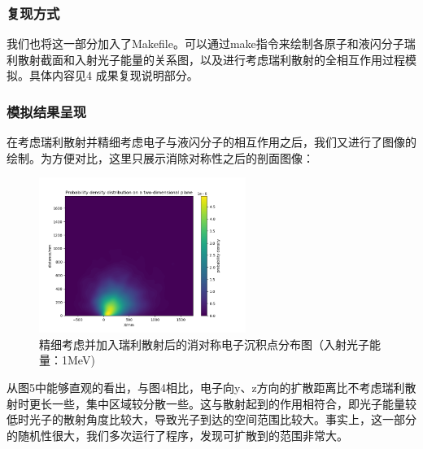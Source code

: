 \documentclass[12pt,a4paper]{article}%
\begin{document}
        \subsubsection{复现方式}
        我们也将这一部分加入了Makefile。可以通过make指令来绘制各原子和液闪分子瑞利散射截面和入射光子能量的关系图，以及进行考虑瑞利散射的全相互作用过程模拟。具体内容见4 成果复现说明部分。

        \subsubsection{模拟结果呈现}
        在考虑瑞利散射并精细考虑电子与液闪分子的相互作用之后，我们又进行了图像的绘制。为方便对比，这里只展示消除对称性之后的剖面图像：
        
        \begin{figure}[hb]
            \centering
            \includegraphics[width=0.6\textwidth]{deposit_all_extend_dissymmetry.png}
            \caption{精细考虑并加入瑞利散射后的消对称电子沉积点分布图（入射光子能量：1MeV)}
            \label{fig:deposit_all_extend_dissymmetry}
        \end{figure}
        
        从图5中能够直观的看出，与图4相比，电子向y、z方向的扩散距离比不考虑瑞利散射时更长一些，集中区域较分散一些。这与散射起到的作用相符合，即光子能量较低时光子的散射角度比较大，导致光子到达的空间范围比较大。事实上，这一部分的随机性很大，我们多次运行了程序，发现可扩散到的范围非常大。        
\end{document}
